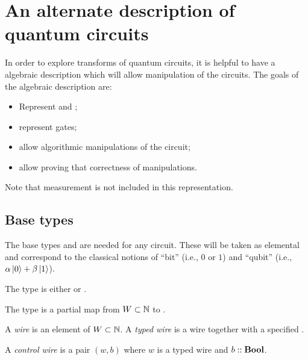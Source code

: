 




\section{An alternate description of quantum circuits} %
\label{sec:an_alternate_description_of_quantum_circuits}

In order to explore transforms of quantum circuits, it is helpful to have a algebraic description
which will allow manipulation of the circuits. The goals of the algebraic description are:
\begin{itemize}
  \item Represent \qubits and \bits;
  \item represent gates;
  \item allow algorithmic manipulations of the circuit;
  \item allow proving that correctness of manipulations.
\end{itemize}

Note that measurement is not included in this representation.

\subsection{Base types} %
\label{sub:base_types}
The base types \bit and \qubit are needed for any circuit. These will be taken as elemental and
correspond to the classical notions of ``bit'' (i.e., $0$ or $1$) and ``qubit'' (i.e.,
$\alpha\left\vert{0}\right\rangle + \beta\left\vert{1}\right\rangle$).
\begin{definition}\label{def:endpoint}
  The type  is either \bit or \qubit.
\end{definition}

\begin{definition}\label{def:arity}
  The type  is a partial map from $W\subset\mathbb{N}$ to .
\end{definition}

\begin{definition}\label{def:wire}
  A \emph{wire} is an element of $W\subset\mathbb{N}$. A \emph{typed wire} is a wire together with a
  specified .
\end{definition}

\begin{definition}\label{def:control}
  A \emph{control wire} is a pair $(w,b)$ where $w$ is a typed wire and $b::\mathbf{{Bool}}$.
\end{definition}

